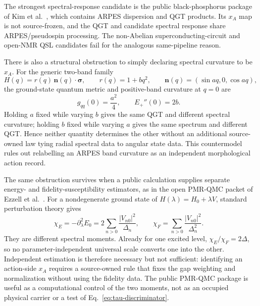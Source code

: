 The strongest spectral-response
candidate is the public black-phosphorus package of Kim et al.\
\citep{Kim2025QGTData}, which contains ARPES dispersion and QGT products.  Its
$x_A$ map is not source-frozen, and the QGT and candidate spectral response
share ARPES/pseudospin processing.  The non-Abelian superconducting-circuit
\citep{Zheng2022QGT} and open-NMR QSL \citep{Pires2024QSL} candidates fail for
the analogous same-pipeline reason.

There is also a structural obstruction to simply declaring spectral
curvature to be $x_A$.  For the generic two-band family
\begin{equation}
 H(q)=r(q)\,\mathbf n(q)\!\cdot\!\boldsymbol\sigma,
 \qquad
 r(q)=1+bq^2,
 \qquad
 \mathbf n(q)=(\sin aq,0,\cos aq),
\end{equation}
the ground-state quantum metric and positive-band curvature at $q=0$ are
\begin{equation}
 g_{qq}(0)=\frac{a^2}{4},
 \qquad
 E_+''(0)=2b.
\end{equation}
Holding $a$ fixed while varying $b$ gives the same QGT and different spectral
curvature; holding $b$ fixed while varying $a$ gives the same spectrum and
different QGT.  Hence neither quantity determines the other without an
additional source-owned law tying radial spectral data to angular state data.
This countermodel rules out relabelling an ARPES band curvature as an
independent morphological action record.

The same obstruction survives when a public calculation supplies separate
energy- and fidelity-susceptibility estimators, as in the open PMR-QMC packet
of Ezzell et al.\ \citep{Ezzell2024Susceptibility}.  For a nondegenerate
ground state of $H(\lambda)=H_0+\lambda V$, standard perturbation theory gives
\begin{equation}
 \chi_E=-\partial_\lambda^2E_0
 =2\sum_{n>0}\frac{|V_{n0}|^2}{\Delta_n},
 \qquad
 \chi_F=\sum_{n>0}\frac{|V_{n0}|^2}{\Delta_n^2}.
 \label{eq:susceptibility-moment-nogo}
\end{equation}
They are different spectral moments.  Already for one excited level,
$\chi_E/\chi_F=2\Delta$, so no parameter-independent universal scale converts
one into the other.  Independent estimation is therefore necessary but not
sufficient: identifying an action-side $x_A$ requires a source-owned rule that
fixes the gap weighting and normalization without using the fidelity data.
The public PMR-QMC package is useful as a computational control of the two
moments, not as an occupied physical carrier or a test of
Eq.~\eqref{eq:tau-discriminator}.

